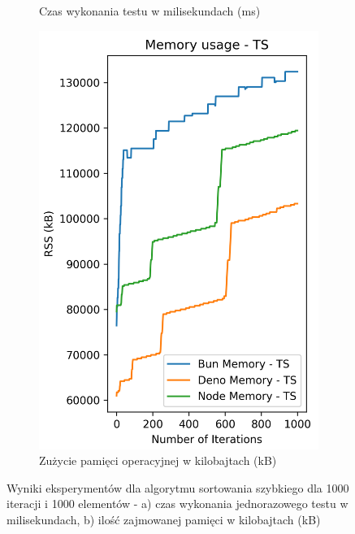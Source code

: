 \begin{figure}[H]
\begin{subfigure}[b]{0.44\textwidth}
    \caption{Czas wykonania testu w milisekundach (ms)}
    \label{fig:quick_sorting_e2_ts_time}
  \end{subfigure}
  \begin{subfigure}[b]{0.44\textwidth}
    \centering
    \includegraphics[width=\textwidth]{Figures/sorting/sorting_quick_1000_1000_ts_memory.png}
    \caption{Zużycie pamięci operacyjnej w kilobajtach (kB)}
    \label{fig:quick_sorting_e2_ts_memory}
  \end{subfigure}
  \caption{Wyniki eksperymentów dla algorytmu sortowania szybkiego dla 1000 iteracji i 1000 elementów - a) czas wykonania jednorazowego testu w milisekundach, b) ilość zajmowanej pamięci w kilobajtach (kB)}
  \label{fig:quick_sorting_e2_ts}
\end{figure}

